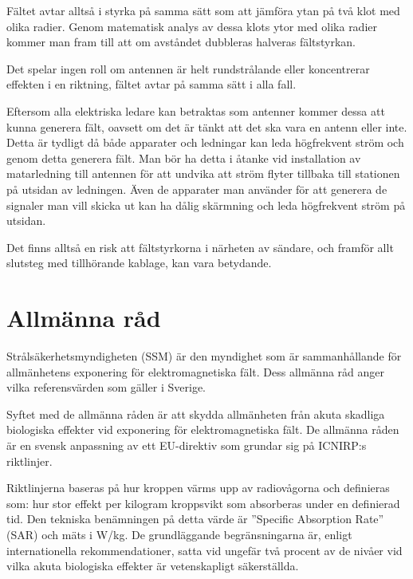 Fältet avtar alltså i styrka på samma sätt som att jämföra ytan på två
klot med olika radier.
Genom matematisk analys av dessa klots ytor med olika radier kommer man fram
till att om avståndet dubbleras halveras fältstyrkan.

Det spelar ingen roll om antennen är helt rundstrålande eller koncentrerar
effekten i en riktning, fältet avtar på samma sätt i alla fall.

Eftersom alla elektriska ledare kan betraktas som antenner kommer dessa att
kunna generera fält, oavsett om det är tänkt att det ska vara en antenn eller
inte.
Detta är tydligt då både apparater och ledningar kan leda högfrekvent ström och
genom detta generera fält.
Man bör ha detta i åtanke vid installation av matarledning till antennen för
att undvika att ström flyter tillbaka till stationen på utsidan av ledningen.
Även de apparater man använder för att generera de signaler man vill skicka ut
kan ha dålig skärmning och leda högfrekvent ström på utsidan.

Det finns alltså en risk att fältstyrkorna i närheten av sändare, och
framför allt slutsteg med tillhörande kablage, kan vara betydande.

\section{Allmänna råd}

Strålsäkerhetsmyndigheten (SSM) är den myndighet som är sammanhållande
för allmänhetens exponering för elektromagnetiska fält.
Dess allmänna råd \cite[SSMFS~2008:18]{SSMFS2008:18} anger vilka referensvärden
som gäller i Sverige.

Syftet med de allmänna råden är att skydda allmänheten från akuta
skadliga biologiska effekter vid exponering för elektromagnetiska fält.
De allmänna råden är en svensk anpassning av ett EU-direktiv som
grundar sig på ICNIRP:s riktlinjer.

Riktlinjerna baseras på hur kroppen värms upp av radiovågorna och definieras
som: hur stor effekt per kilogram kroppsvikt som absorberas under en definierad
tid.
Den tekniska benämningen på detta värde är ''Specific Absorption Rate'' (SAR)
och mäts i W/kg.
De grundläggande begränsningarna är, enligt internationella rekommendationer,
satta vid ungefär två procent av de nivåer vid vilka akuta biologiska effekter
är vetenskapligt säkerställda.

